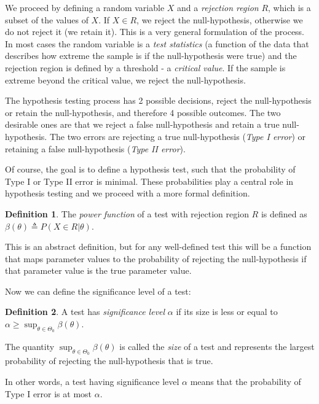\documentclass{book}
\theoremstyle{plain}%
\theoremstyle{definition}
\newtheorem{definition}{Definition}[section]
\begin{document}
We proceed by defining a random variable $X$ and a \emph{rejection region} $R$, which is a subset of the values of $X$. If $X \in R$, we reject the null-hypothesis, otherwise we do not reject it (we retain it). This is a very general formulation of the process. In most cases the random variable is a \emph{test statistics} (a function of the data that describes how extreme the sample is if the null-hypothesis were true) and the rejection region is defined by a threshold - a \emph{critical value}. If the sample is extreme beyond the critical value, we reject the null-hypothesis.

The hypothesis testing process has 2 possible decisions, reject the null-hypothesis or retain the null-hypothesis, and therefore 4 possible outcomes. The two desirable ones are that we reject a false null-hypothesis and retain a true null-hypothesis. The two errors are rejecting a true null-hypothesis (\emph{Type I error}) or retaining a false null-hypothesis (\emph{Type II error}).

Of course, the goal is to define a hypothesis test, such that the probability of Type I or Type II error is minimal. These probabilities play a central role in hypothesis testing and we proceed with a more formal definition.

\begin{definition}
The \emph{power function} of a test with rejection region $R$ is defined as $\beta(\theta) \triangleq P(X \in R|\theta)$.
\end{definition}

This is an abstract definition, but for any well-defined test this will be a function that maps parameter values to the probability of rejecting the null-hypothesis if that parameter value is the true parameter value.

Now we can define the significance level of a test:

\begin{definition} A test has \emph{significance level} $\alpha$ if its size is less or equal to $\alpha \geq \sup_{\theta \in \Theta_0} \beta(\theta)$.

The quantity $ \sup_{\theta \in \Theta_0} \beta(\theta)$ is called the \emph{size} of a test and represents the largest probability of rejecting the null-hypothesis that is true.

\end{definition}

In other words, a test having significance level $\alpha$ means that the probability of Type I error is at most $\alpha$.
\end{document}
